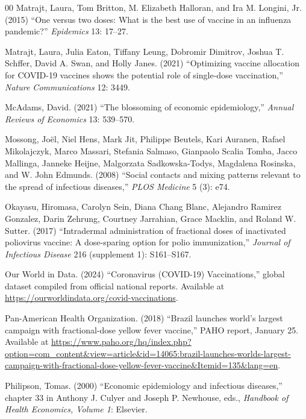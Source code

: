 \documentclass[12pt]{article}
\begin{document}
\begin{thebibliography}{00}
Matrajt, Laura, Tom Britton, M. Elizabeth Halloran, and Ira
M. Longini, Jr. (2015) ``One versus two doses: What is the best use of
vaccine in an influenza pandemic?'' {\em Epidemics} 13: 17--27.

Matrajt, Laura, Julia Eaton, Tiffany Leung, Dobromir Dimitrov, Joshua
T. Schffer, David A. Swan, and Holly Janes. (2021) ``Optimizing
vaccine allocation for COVID-19 vaccines shows the potential role of
single-dose vaccination,'' {\em Nature Communications} 12: 3449.

McAdams, David. (2021) ``The blossoming of economic epidemiology,''
{\em Annual Reviews of Economics} 13: 539--570.

Mossong, Jo\"{e}l, Niel Hens, Mark Jit, Philippe Beutels, Kari
Auranen, Rafael Mikolajczyk, Marco Massari, Stefania Salmaso,
Gianpaolo Scalia Tomba, Jacco Mallinga, Janneke Heijne, Malgorzata
Sadkowska-Todys, Magdalena Rosinska, and W. John Edmunds. (2008)
``Social contacts and mixing patterns relevant to the spread of
infectious diseases,'' {\em PLOS Medicine} 5 (3): e74.

Okayasu, Hiromasa, Carolyn Sein, Diana Chang Blanc, Alejandro Ramirez
Gonzalez, Darin Zehrung, Courtney Jarrahian, Grace Macklin, and Roland
W. Sutter. (2017) ``Intradermal administration of fractional doses of
inactivated poliovirus vaccine: A dose-sparing option for polio
immunization,'' {\em Journal of Infectious Disease} 216 (supplement
1): S161--S167.

Our World in Data. (2024) ``Coronavirus (COVID-19) Vaccinations,'' 
global dataset compiled from official national reports. Available at 
\url{https://ourworldindata.org/covid-vaccinations}.

Pan-American Health Organization. (2018) ``Brazil launches world's
largest campaign with fractional-dose yellow fever vaccine,'' PAHO
report, January 25. Available at
\url{https://www.paho.org/hq/index.php?option=com_content&view=article&id=14065:brazil-launches-worlds-largest-campaign-with-fractional-dose-yellow-fever-vaccine&Itemid=135&lang=en}.

Philipson, Tomas. (2000) ``Economic epidemiology and infectious
diseases,'' chapter 33 in Anthony J. Culyer and Joseph P. Newhouse,
eds., {\em Handbook of Health Economics, Volume 1}: Elsevier.


\end{thebibliography}
\end{document}
